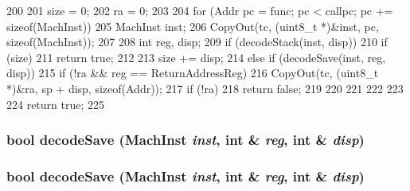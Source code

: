 \begin{DoxyCode}
200 {
201     size = 0;
202     ra = 0;
203 
204     for (Addr pc = func; pc < callpc; pc += sizeof(MachInst)) {
205         MachInst inst;
206         CopyOut(tc, (uint8_t *)&inst, pc, sizeof(MachInst));
207 
208         int reg, disp;
209         if (decodeStack(inst, disp)) {
210             if (size) {
211                 return true;
212             }
213             size += disp;
214         } else if (decodeSave(inst, reg, disp)) {
215             if (!ra && reg == ReturnAddressReg) {
216                 CopyOut(tc, (uint8_t *)&ra, sp + disp, sizeof(Addr));
217                 if (!ra) {
218                     return false;
219                 }
220             }
221         }
222     }
223 
224     return true;
225 }
\end{DoxyCode}
\hypertarget{classMipsISA_1_1StackTrace_ae56dad5982b67d8717714c383b6a59f8}{
\subsubsection[{decodeSave}]{\setlength{\rightskip}{0pt plus 5cm}bool decodeSave ({\bf MachInst} {\em inst}, \/  int \& {\em reg}, \/  int \& {\em disp})}}
\label{classMipsISA_1_1StackTrace_ae56dad5982b67d8717714c383b6a59f8}
\hypertarget{classMipsISA_1_1StackTrace_ae56dad5982b67d8717714c383b6a59f8}{
\subsubsection[{decodeSave}]{\setlength{\rightskip}{0pt plus 5cm}bool decodeSave ({\bf MachInst} {\em inst}, \/  int \& {\em reg}, \/  int \& {\em disp})}}
\label{classMipsISA_1_1StackTrace_ae56dad5982b67d8717714c383b6a59f8}



